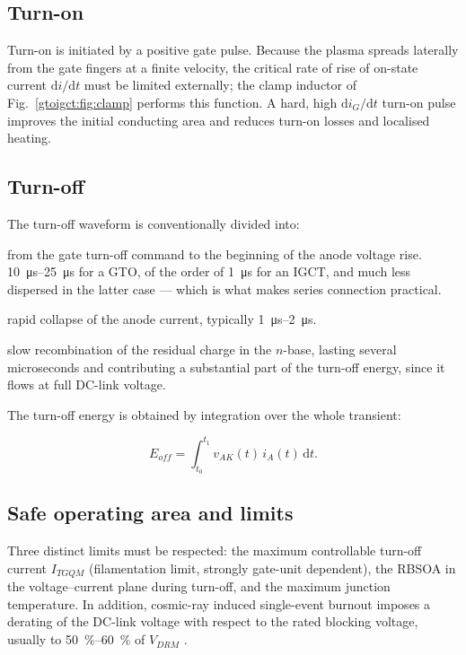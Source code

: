 \subsection{Turn-on}

Turn-on is initiated by a positive gate pulse. Because the plasma spreads
laterally from the gate fingers at a finite velocity, the critical rate of rise
of on-state current $\mathrm{d}i/\mathrm{d}t$ must be limited externally; the
clamp inductor of Fig.~\ref{gtoigct:fig:clamp} performs this function. A hard, high
$\mathrm{d}i_{G}/\mathrm{d}t$ turn-on pulse improves the initial conducting area
and reduces turn-on losses and localised heating.

\subsection{Turn-off}

The turn-off waveform is conventionally divided into:

\begin{description}[nosep]
  \item[Storage time $t_{s}$] from the gate turn-off command to the beginning of
        the anode voltage rise. \SIrange{10}{25}{\micro\second} for a GTO, of the
        order of \SI{1}{\micro\second} for an IGCT, and much less dispersed in
        the latter case --- which is what makes series connection practical.
  \item[Fall time $t_{f}$] rapid collapse of the anode current, typically
        \SIrange{1}{2}{\micro\second}.
  \item[Tail current] slow recombination of the residual charge in the $n$-base,
        lasting several microseconds and contributing a substantial part of the
        turn-off energy, since it flows at full DC-link voltage.
\end{description}

The turn-off energy is obtained by integration over the whole transient:

\begin{equation}
E_{off} = \int_{t_{0}}^{t_{1}} v_{AK}(t)\, i_{A}(t)\, \mathrm{d}t .
\end{equation}

\subsection{Safe operating area and limits}

Three distinct limits must be respected: the maximum controllable turn-off
current $I_{TGQM}$ (filamentation limit, strongly gate-unit dependent), the RBSOA
in the voltage--current plane during turn-off, and the maximum junction
temperature. In addition, cosmic-ray induced single-event burnout imposes a
derating of the DC-link voltage with respect to the rated blocking voltage,
usually to \SIrange{50}{60}{\percent} of $V_{DRM}$ \cite{abb5sya2033}.

